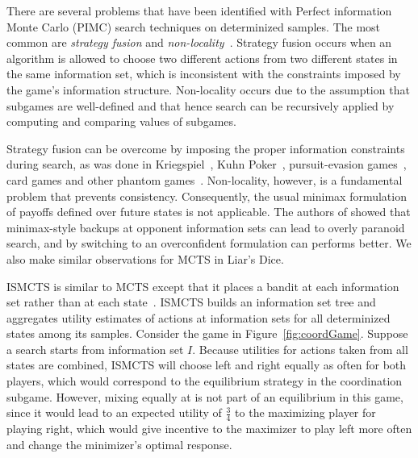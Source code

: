 \documentclass[letterpaper]{article}
\begin{document}

There are several problems that have been identified with Perfect information Monte Carlo (PIMC) search techniques
on determinized samples. The most common are {\it strategy fusion} and {\it non-locality}~\cite{Frank98Finding}.
Strategy fusion occurs when an algorithm is allowed to choose two different actions from two different states in the same 
information set, which is inconsistent with the constraints imposed by the game's information structure. 
Non-locality occurs due to the assumption that subgames are well-defined and that hence search can be 
recursively applied by computing and comparing values of subgames. 

Strategy fusion can be overcome by imposing the proper information constraints during search, as was done in 
Kriegspiel~\cite{Ciancarini10Kriegspiel}, Kuhn Poker~\cite{Ponsen11Computing}, pursuit-evasion games~\cite{Lisy12peg}, 
card games and other phantom games~\cite{Cowling12ISMCTS}. 
Non-locality, however, is a fundamental problem that prevents consistency.
Consequently, the usual minimax formulation of payoffs defined over future states is not applicable.  
The authors of \cite{Parker10iss,Parker06Overconfidence} showed that minimax-style backups at opponent information 
sets can lead to overly paranoid search, and by switching to an overconfident formulation can performs better.
We also make similar observations for MCTS in Liar's Dice. 

ISMCTS is similar to MCTS except that it places a bandit at each information set rather than at each 
state~\cite{Cowling12ISMCTS}. ISMCTS builds an information set tree and aggregates utility estimates of actions 
at information sets for all determinized states among its samples. 
Consider the game in Figure~\ref{fig:coordGame}. 
Suppose a search starts from information set $I$. Because utilities for actions taken from all states are combined, 
ISMCTS will choose left and right equally as often for both players, which would correspond to the equilibrium 
strategy in the coordination subgame. However, mixing equally at is not part of an equilibrium in this game, since
it would lead to an expected utility of $\frac{3}{4}$ to the maximizing player for playing right, which 
would give incentive to the maximizer to play left more often and change the minimizer's optimal response.  
\end{document}
